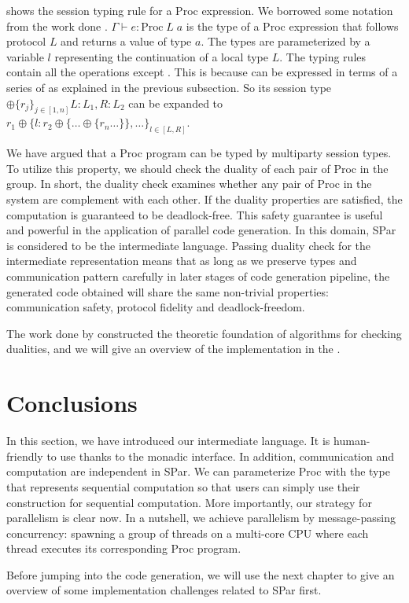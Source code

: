  shows the session typing rule for a Proc expression. We borrowed some notation from the work done \cite{AlgebraicMultipartyProtocol}. $\Gamma \vdash e : \text{Proc} \; L \; a$ is the type of a Proc expression that follows protocol $L$ and returns a value of type $a$. The types are parameterized by a variable $l$ representing the continuation of a local type $L$. The typing rules contain all the operations except . This is because  can be expressed in terms of a series of  as explained in the previous subsection. So its session type $\oplus \{r_j\}_{j \in [1,n]} {L:L_1, R: L_2}$ can be expanded to $r_1 \oplus \{l: r_2 \oplus \{\ldots \oplus\{r_n \ldots\}\},\ldots\}_{l \in [L, R]}$. 

We have argued that a Proc program can be typed by multiparty session types. To utilize this property, we should check the duality of each pair of Proc in the group. In short, the duality check examines whether any pair of Proc in the system are complement with each other. If the duality properties are satisfied, the computation is guaranteed to be deadlock-free. This safety guarantee is useful and powerful in the application of parallel code generation. In this domain, SPar is considered to be the intermediate language. Passing duality check for the intermediate representation means that as long as we preserve types and communication pattern carefully in later stages of code generation pipeline, the generated code obtained will share the same non-trivial properties: communication safety, protocol fidelity and deadlock-freedom.

The work done by \cite{coppoGentleIntroductionMultiparty2015} constructed the theoretic foundation of algorithms for checking dualities, and we will give an overview of the implementation in the .

\section{Conclusions}
In this section, we have introduced our intermediate language. It is human-friendly to use thanks to the monadic interface. In addition, communication and computation are independent in SPar. We can parameterize Proc with the type that represents sequential computation so that users can simply use their construction for sequential computation. More importantly, our strategy for parallelism is clear now. In a nutshell, we achieve parallelism by message-passing concurrency: spawning a group of threads on a multi-core CPU where each thread executes its corresponding Proc program.

Before jumping into the code generation, we will use the next chapter to give an overview of some implementation challenges related to SPar first.